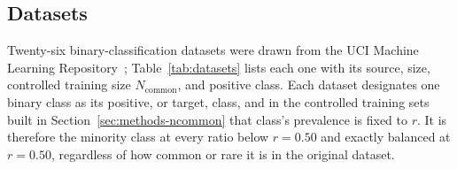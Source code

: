 \subsection{Datasets}
\label{sec:methods-datasets}

Twenty-six binary-classification datasets were drawn from the UCI Machine Learning Repository~\cite{kelly_uci}; Table~\ref{tab:datasets} lists each one with its source, size, controlled training size $N_{\text{common}}$, and positive class. Each dataset designates one binary class as its positive, or target, class, and in the controlled training sets built in Section~\ref{sec:methods-ncommon} that class's prevalence is fixed to $r$. It is therefore the minority class at every ratio below $r{=}0.50$ and exactly balanced at $r{=}0.50$, regardless of how common or rare it is in the original dataset.

